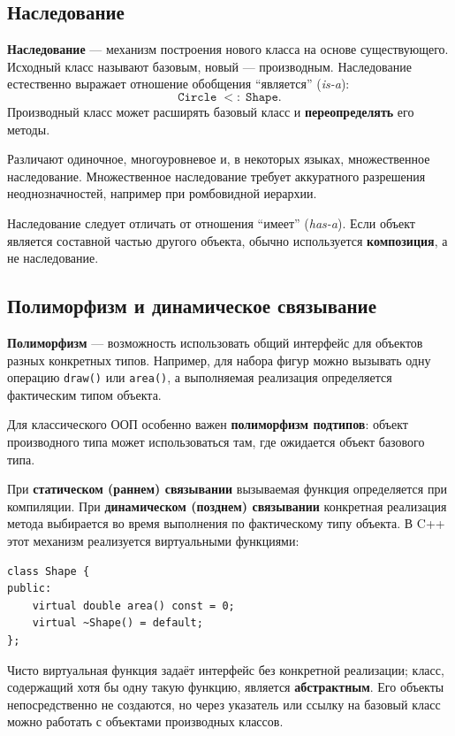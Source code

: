 \subsection{Наследование}

\textbf{Наследование} --- механизм построения нового класса на основе существующего. Исходный класс называют базовым, новый --- производным. Наследование естественно выражает отношение обобщения ``является'' (\textit{is-a}):
\[
\texttt{Circle} \;<:\; \texttt{Shape}.
\]
Производный класс может расширять базовый класс и \textbf{переопределять} его методы.

Различают одиночное, многоуровневое и, в некоторых языках, множественное наследование. Множественное наследование требует аккуратного разрешения неоднозначностей, например при ромбовидной иерархии.

Наследование следует отличать от отношения ``имеет'' (\textit{has-a}). Если объект является составной частью другого объекта, обычно используется \textbf{композиция}, а не наследование.

\subsection{Полиморфизм и динамическое связывание}

\textbf{Полиморфизм} --- возможность использовать общий интерфейс для объектов разных конкретных типов. Например, для набора фигур можно вызывать одну операцию \texttt{draw()} или \texttt{area()}, а выполняемая реализация определяется фактическим типом объекта.

Для классического ООП особенно важен \textbf{полиморфизм подтипов}: объект производного типа может использоваться там, где ожидается объект базового типа.

При \textbf{статическом (раннем) связывании} вызываемая функция определяется при компиляции. При \textbf{динамическом (позднем) связывании} конкретная реализация метода выбирается во время выполнения по фактическому типу объекта. В C++ этот механизм реализуется виртуальными функциями:
\begin{verbatim}
class Shape {
public:
    virtual double area() const = 0;
    virtual ~Shape() = default;
};
\end{verbatim}
Чисто виртуальная функция задаёт интерфейс без конкретной реализации; класс, содержащий хотя бы одну такую функцию, является \textbf{абстрактным}. Его объекты непосредственно не создаются, но через указатель или ссылку на базовый класс можно работать с объектами производных классов.

